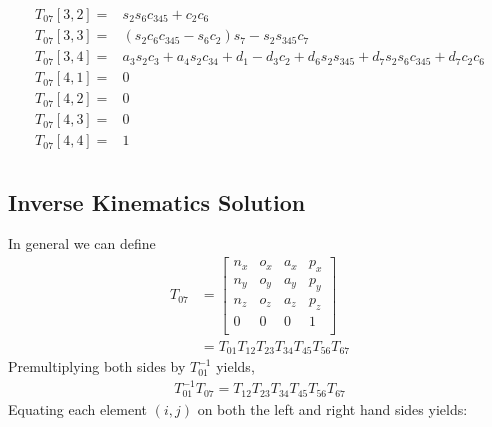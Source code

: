 \documentclass[onecolumn,10pt]{jhwhw}
\begin{document}
\begin{align*}
T_{07}[3, 2] =& s_{2} s_{6} c_{345} + c_{2} c_{6} \\
T_{07}[3, 3] =& \left(s_{2} c_{6} c_{345} - s_{6} c_{2}\right) s_{7} - s_{2} s_{345} c_{7} \\
T_{07}[3, 4] =& a_{3} s_{2} c_{3} + a_{4} s_{2} c_{34} + d_{1} - d_{3} c_{2} + d_{6} s_{2} s_{345} + d_{7} s_{2} s_{6} c_{345} + d_{7} c_{2} c_{6} \\
T_{07}[4, 1] =& 0 \\
T_{07}[4, 2] =& 0 \\
T_{07}[4, 3] =& 0 \\
T_{07}[4, 4] =& 1 \\
\end{align*}

\subsection{Inverse Kinematics Solution}
In general we can define
\begin{align*}
T_{07} &=
\left[\begin{matrix}
n_x & o_x & a_x & p_x \\
n_y & o_y & a_y & p_y \\
n_z & o_z & a_z & p_z \\
  0 &   0 &   0 &   1 \\
\end{matrix}\right]\\
&= T_{01} T_{12} T_{23} T_{34} T_{45} T_{56} T_{67}
\end{align*}
Premultiplying both sides by $T_{01}^{-1}$ yields,
\begin{align*}
T_{01}^{-1} T_{07} = T_{12} T_{23} T_{34} T_{45} T_{56} T_{67}
\end{align*}
Equating each element $(i,j)$ on both the left and right hand sides yields:
\end{document}
